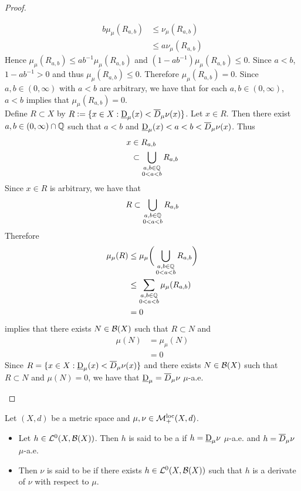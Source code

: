 \documentclass{book}
\begin{document}
\begin{proof}
\begin{enumerate}
			\begin{align*}
				b\mu_{\mu}(R_{a,b}) 
				& \leq \nu_{\mu}(R_{a,b}) \\
				& \leq a \nu_{\mu}(R_{a,b}) 
			\end{align*}
			Hence $\mu_{\mu}(R_{a,b}) \leq ab^{-1} \mu_{\mu}(R_{a,b})$ and $(1 - ab^{-1}) \mu_{\mu}(R_{a,b}) \leq 0$. Since $a < b$, $1- ab^{-1} > 0$ and thus $\mu_{\mu}(R_{a,b}) \leq 0$. Therefore $\mu_{\mu}(R_{a,b}) = 0$. Since $a,b \in (0,\infty)$ with $a < b$ are arbitrary, we have that for each $a,b \in (0,\infty)$, $a < b$ implies that $\mu_{\mu}(R_{a,b}) = 0$. \\
			Define $R \subset X$ by $R \vcentcolon= \{x \in X:  \underbar{D}_{\mu}(x) < \overline{D}_{\mu} \nu (x)\}$. Let $x \in R$. Then there exist $a,b \in (0, \infty) \cap \mathbb{Q}$ such that $a < b$ and $\underbar{D}_{\mu}(x) < a < b < \overline{D}_{\mu} \nu (x)$. Thus 
			\begin{align*}
				x 
				& \in R_{a,b} \\ 
				& \subset \bigcup_{\substack{a,b \in \mathbb{Q} \\ 0 < a < b}} R_{a,b}
			\end{align*}
			Since $x \in R$ is arbitrary, we have that 
			$$R \subset \bigcup\limits_{\substack{a,b \in \mathbb{Q} \\ 0 < a < b}} R_{a,b}$$ 
			Therefore 
			\begin{align*}
				\mu_{\mu}(R) 
				& \leq \mu_{\mu} \bigg( \bigcup_{\substack{a,b \in \mathbb{Q} \\ 0 < a < b}} R_{a,b} \bigg) \\
				& \leq \sum\limits_{\substack{a,b \in \mathbb{Q} \\ 0 < a < b}} \mu_{\mu}(R_{a,b}) \\
				& = 0
			\end{align*}
			 implies that there exists $N \in \mathcal{B}(X)$ such that $R \subset N$ and 
			\begin{align*}
				\mu(N) 
				& = \mu_{\mu}(N) \\
				& = 0
			\end{align*}
			Since $R = \{x \in X:  \underbar{D}_{\mu}(x) < \overline{D}_{\mu} \nu (x)\}$ and there exists $N \in \mathcal{B}(X)$ such that $R \subset N$ and $\mu(N) = 0$, we have that $\underbar{D}_{\mu} = \overline{D}_{\mu} \nu$ $\mu$-a.e.
		\end{enumerate}
	\end{proof}

	\begin{defn} 
		Let $(X, d)$ be a metric space and $\mu, \nu \in \mathcal{M}_+^{\text{loc}}(X, d)$. 
		\begin{itemize}
			\item Let $h \in \mathcal{L}^0(X, \mathcal{B}(X))$. Then $h$ is said to be a  if $h = \underbar{D}_{\mu}\nu$ $\mu$-a.e. and $h = \overline{D}_{\mu}\nu$ $\mu$-a.e. 
			\item Then $\nu$ is said to be  if there exists $h \in \mathcal{L}^0(X, \mathcal{B}(X))$ such that $h$ is a derivate of $\nu$ with respect to $\mu$.
		\end{itemize}
	\end{defn}
\end{document}
